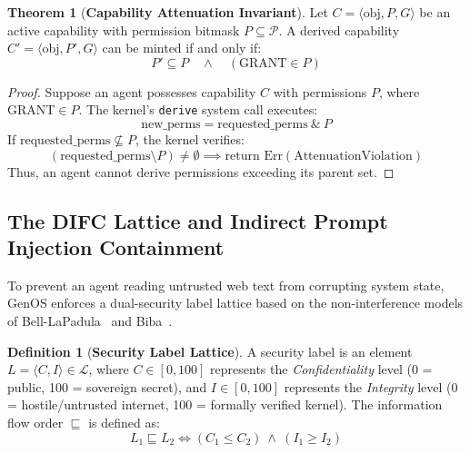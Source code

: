\documentclass[10pt,journal,compsoc]{IEEEtran}
\theoremstyle{definition}
\newtheorem{definition}{Definition}
\newtheorem{theorem}{Theorem}
\begin{document}
\begin{theorem}[\textbf{Capability Attenuation Invariant}]
Let $C = \langle \text{obj}, P, G \rangle$ be an active capability with permission bitmask $P \subseteq \mathcal{P}$. A derived capability $C' = \langle \text{obj}, P', G \rangle$ can be minted if and only if:
$$P' \subseteq P \quad \land \quad (\text{GRANT} \in P)$$
\end{theorem}
\begin{proof}
Suppose an agent possesses capability $C$ with permissions $P$, where $\text{GRANT} \in P$. The kernel's \texttt{derive} system call executes:
$$\text{new\_perms} = \text{requested\_perms} \ \& \ P$$
If $\text{requested\_perms} \not\subseteq P$, the kernel verifies:
$$(\text{requested\_perms} \setminus P) \neq \emptyset \implies \text{return Err}(\text{AttenuationViolation})$$
Thus, an agent cannot derive permissions exceeding its parent set.
\end{proof}

\subsection{The DIFC Lattice and Indirect Prompt Injection Containment}
To prevent an agent reading untrusted web text from corrupting system state, GenOS enforces a dual-security label lattice based on the non-interference models of Bell-LaPadula~\cite{bell1973secure} and Biba~\cite{biba1977integrity}.

\begin{definition}[\textbf{Security Label Lattice}]
A security label is an element $L = \langle C, I \rangle \in \mathcal{L}$, where $C \in [0, 100]$ represents the \textit{Confidentiality} level (0 = public, 100 = sovereign secret), and $I \in [0, 100]$ represents the \textit{Integrity} level (0 = hostile/untrusted internet, 100 = formally verified kernel).
The information flow order $\sqsubseteq$ is defined as:
$$L_1 \sqsubseteq L_2 \iff (C_1 \le C_2) \ \land \ (I_1 \ge I_2)$$
\end{definition}
\end{document}

